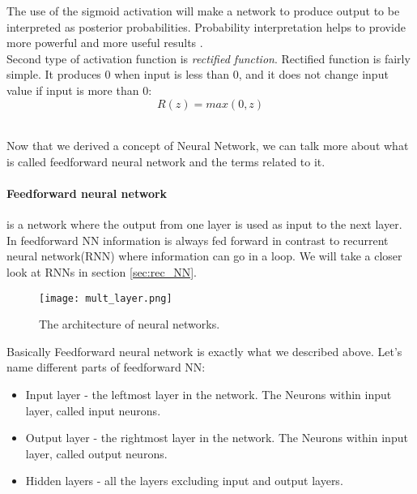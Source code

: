 The use of the sigmoid activation will make a network to produce output to be
interpreted as posterior probabilities. Probability interpretation helps to provide
more powerful and more useful results \cite{Bishop1995}.
\\
Second type of activation function is \emph{rectified function}.
Rectified function is fairly simple.
It produces $0$ when input is less than $0$, and it does not change input value if
input is more than 0:
\begin{equation} \label{eq:rect_function}
	R(z) = max(0, z)
\end{equation}

\\


Now that we derived a concept of Neural Network, we can talk more about
what is called feedforward neural network and the terms related to it.
\paragraph{Feedforward neural network} is a network where the output
from one layer is used as input to the next layer. In feedforward NN
information is always fed forward in contrast to recurrent neural network(RNN)
where information can go in a loop. We will take a closer look at RNNs in section
\autoref{sec:rec_NN}.

\begin{figure}[H]
	\texttt{[image: mult\_layer.png]}
	\caption{The architecture of neural networks\cite{Nielsen2015}.} %
	\label{img:mult_layer} %
\end{figure}

Basically Feedforward neural network is exactly
what we described above. Let's name different parts of feedforward NN:

\begin{itemize}
	\item Input layer - the leftmost layer in the network. The Neurons within
		input layer, called input neurons.
	\item Output layer - the rightmost layer in the network. The Neurons within
		input layer, called output neurons.
	\item Hidden layers - all the layers excluding input and output layers.
\end{itemize}

